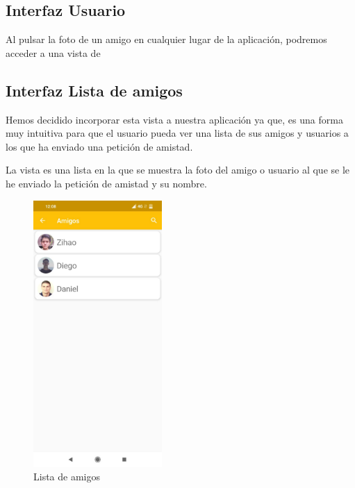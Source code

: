\subsection{Interfaz Usuario}
Al pulsar la foto de un amigo en cualquier lugar de la aplicación, podremos acceder a una vista de 

\subsection{Interfaz Lista de amigos}
Hemos decidido incorporar esta vista a nuestra aplicación ya que, es una forma muy intuitiva para que el usuario pueda ver una lista de sus amigos y usuarios a los que
ha enviado una petición de amistad.

La vista es una lista en la que se muestra la foto del amigo o usuario al que se le he enviado la petición de amistad y su nombre.
\begin{figure}[H]
    \centering
    \includegraphics[height=4in]{figures/chapter-3/listaAmigos.jpg}
    \caption{Lista de amigos}
    \label{fig:listaAmigos}
\end{figure}
